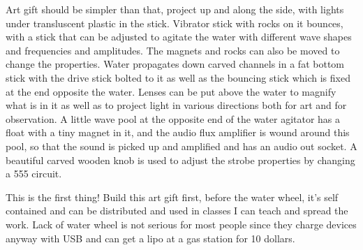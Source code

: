Art gift should be simpler than that, project up and along the side,
with lights under transluscent plastic in the stick. Vibrator stick with
rocks on it bounces, with a stick that can be adjusted to agitate the
water with different wave shapes and frequencies and amplitudes. The
magnets and rocks can also be moved to change the properties. Water
propagates down carved channels in a fat bottom stick with the drive
stick bolted to it as well as the bouncing stick which is fixed at the
end opposite the water. Lenses can be put above the water to magnify
what is in it as well as to project light in various directions both for
art and for observation. A little wave pool at the opposite end of the
water agitator has a float with a tiny magnet in it, and the audio flux
amplifier is wound around this pool, so that the sound is picked up and
amplified and has an audio out socket. A beautiful carved wooden knob is
used to adjust the strobe properties by changing a 555 circuit.

This is the first thing! Build this art gift first, before the water
wheel, it's self contained and can be distributed and used in classes I
can teach and spread the work. Lack of water wheel is not serious for
most people since they charge devices anyway with USB and can get a lipo
at a gas station for 10 dollars.
